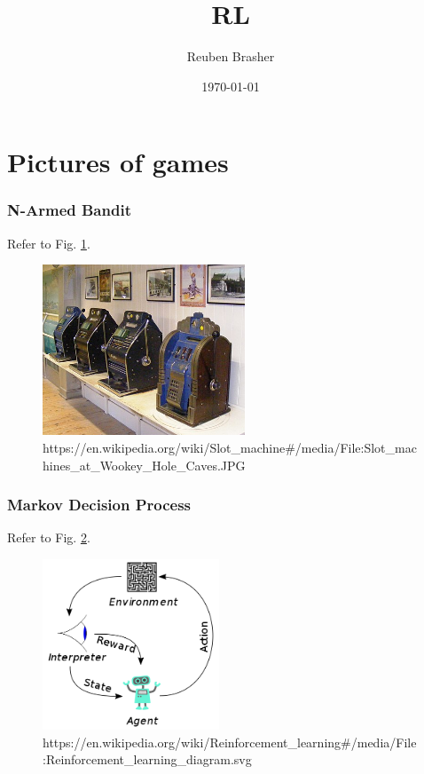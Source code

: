 \documentclass{beamer}
\title{RL}
\author{Reuben Brasher}
\date{\today}
\begin{document}
\frame{\titlepage}

\section[Outline]{}
\frame{\tableofcontents}

\section{Pictures of games}

\frame
{
   \frametitle{N-Armed Bandit}
   
   Refer to Fig. \ref{fig:narmed}.
   
   \begin{figure}[ht]
      \includegraphics[height=2in,keepaspectratio]{images/Slot_machines_at_Wookey_Hole_Caves.JPG}
      \caption{https://en.wikipedia.org/wiki/Slot_machine\#/media/File:Slot_machines_at_Wookey_Hole_Caves.JPG} \label{fig:narmed}
   \end{figure}
}

\frame
{
   \frametitle{Markov Decision Process}
   
   Refer to Fig. \ref{fig:mdp}.
   
   \begin{figure}[ht]
      \includegraphics[height=2in,keepaspectratio]{images/Reinforcement_learning_diagram.svg.png}
      \caption{https://en.wikipedia.org/wiki/Reinforcement_learning\#/media/File:Reinforcement_learning_diagram.svg} \label{fig:mdp}
   \end{figure}
}
\end{document}
